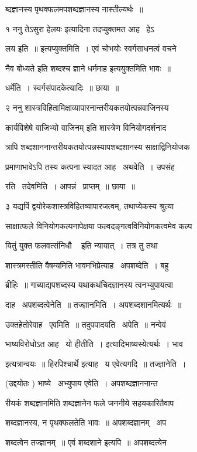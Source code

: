 \documentclass[11pt, openany]{book}
\begin{document}
ब्दज्ञानस्य पृथक्फलमपशब्दज्ञानस्य नास्तील्यर्थः~॥ 



१ ननु तेऽसुरा हेलयः इत्यादिना तदप्युक्तमत आह \textendash\ हेऽ \textendash\ 

लय इति~॥ इत्यप्युक्तमिति~। एवं चोभयोः स्वर्गसाधनत्वं वचने \textendash\ 

नैव बोध्यते इति {\qt शब्दश्च ज्ञाने धर्ममाह} इत्ययुक्तमिति भावः~॥ 

धर्मेति~। स्वर्गसंपादकेत्यादिः~॥ छाया~॥ 

२ ननु शास्त्रविहितामिक्षाव्यापारनान्तरीयकतयोत्पन्नवाजिनस्य 

{\qt कार्यविशेषे वाजिभ्यो वाजिनम्} इति शास्त्रेण विनियोगदर्शनाद \textendash\ 

त्रापि शब्दशाननान्तरीयकतयोत्पन्नस्यापशब्दशानस्य साक्षाद्विनियोजक \textendash\ 

प्रमाणाभावेऽपि तस्य कत्पना स्यादत आह \textendash\ अथवेति~। उपसंह \textendash\ 

रति \textendash\ तदेवमिति~। आपन्नं \textendash\ प्राप्तम्~॥ छाया~॥ 

३ यद्यपिं द्वयोरेकशास्त्रविहितव्यापारजत्वम्, तथाप्येकस्य श्रुत्या 

साक्षात्फले विनियोगकल्पनापेक्षया फल्वदङ्गत्वविनियोगकत्वमेव कल्प \textendash\ 

यितुं युक्त {\qt फलवत्संनिधौ \textendash\ } इति न्यायात्~। तत्र तु तथा 

शास्त्रमस्तीति वैषम्यमिति भावमभिप्रेत्याह \textendash\ अपशब्देति~। बहु \textendash\ 

ब्रीहिः~॥ गाब्याद्यपशब्दस्य यथाकथंचिदज्ञानस्य त्वनभ्युपायत्वा \textendash\ 

दाह \textendash\ अपशब्दत्वेनेति~॥ तज्ज्ञानमिति~। अपशब्दशानमित्यर्थः~॥ 

उक्तहेतोरेवाह \textendash\ एवमिति~॥ तदुपपादयति \textendash\ अपेति~॥ नन्वेवं 

भाष्यविरोधोऽत आह \textendash\ यो हीतीति~। इत्यादिभाष्यस्येत्यर्थः~। भाव 

इत्यत्रान्वयः~॥ हिरपिश्चार्थे इत्याह \textendash\ य एवेत्यगदि~॥ तज्ज्ञानेति~। 



(उद्दयोतः ) भाष्ये \textendash\ अभ्युपाय एवेति~। अपशब्दज्ञाननान्त \textendash\ 

रीयकं शब्दज्ञानमिति शब्दज्ञानेन फले जननीये सहयकारितैवाप \textendash\ 

शब्दज्ञानस्य, न पृथक्फलतेति भावः~॥ अपशब्दज्ञानम् \textendash\ अप \textendash\ 

शब्दत्वेन तज्ज्ञानम्~॥ एवं {\qt शब्दशाने} इत्यपि~॥ अपशब्दत्येन 
\end{document}
